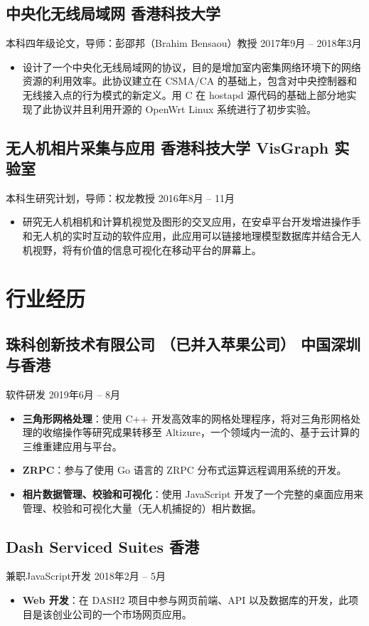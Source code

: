 \documentclass[
  10pt,           %
  autoindent=0pt, %
  scheme=plain,   %
]{ctexart}
\newcommand{\subsec}[2]{\subsection*{#1 \hfill {\normalfont #2}}}
\newcommand{\subsecdesc}[2]{{\kaishu #1 \hfill #2}}
\begin{document}
  \subsec{中央化无线局域网}{香港科技大学}
  \subsecdesc{本科四年级论文，导师：彭邵邦（Brahim Bensaou）教授}{2017年9月 -- 2018年3月}
  \begin{itemize}
    \item 设计了一个中央化无线局域网的协议，目的是增加室内密集网络环境下的网络资源的利用效率。此协议建立在 CSMA/CA 的基础上，包含对中央控制器和无线接入点的行为模式的新定义。用 C 在 hostapd 源代码的基础上部分地实现了此协议并且利用开源的 OpenWrt Linux 系统进行了初步实验。
  \end{itemize}

  \subsec{无人机相片采集与应用}{香港科技大学 VisGraph 实验室}
  \subsecdesc{本科生研究计划，导师：权龙教授}{2016年8月 -- 11月}
  \begin{itemize}
    \item 研究无人机相机和计算机视觉及图形的交叉应用，在安卓平台开发增进操作手和无人机的实时互动的软件应用，此应用可以链接地理模型数据库并结合无人机视野，将有价值的信息可视化在移动平台的屏幕上。
  \end{itemize}

\section*{行业经历} %

  \subsec{珠科创新技术有限公司 {\small （已并入苹果公司）}}{中国深圳与香港}
  \subsecdesc{软件研发}{2019年6月 -- 8月}
  \begin{itemize}
    \item \textbf{三角形网格处理}：使用 C++ 开发高效率的网格处理程序，将对三角形网格处理的收缩操作等研究成果转移至 Altizure，一个领域内一流的、基于云计算的三维重建应用与平台。
    \item \textbf{ZRPC}：参与了使用 Go 语言的 ZRPC 分布式运算远程调用系统的开发。
    \item \textbf{相片数据管理、校验和可视化}：使用 JavaScript 开发了一个完整的桌面应用来管理、校验和可视化大量（无人机捕捉的）相片数据。
  \end{itemize}
          
  \subsec{Dash Serviced Suites}{香港}
  \subsecdesc{兼职JavaScript开发}{2018年2月 -- 5月}
  \begin{itemize}
    \item \textbf{Web 开发}：在 DASH2 项目中参与网页前端、API 以及数据库的开发，此项目是该创业公司的一个市场网页应用。
  \end{itemize}
\end{document}
